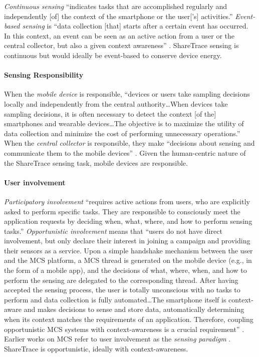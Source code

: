 \emph{Continuous sensing} ``indicates tasks that are accomplished regularly and independently [of] the context of the smartphone or the user['s] activities.'' \emph{Event-based sensing} is ``data collection [that] starts after a certain event has occurred. In this context, an event can be seen as an active action from a user or the central collector, but also a given context awareness'' \citep{Capponi2019}. ShareTrace sensing is continuous but would ideally be event-based to conserve device energy.

\paragraph{Sensing Responsibility}

When the \emph{mobile device} is responsible, ``devices or users take sampling decisions locally and independently from the central authority{\ldots}When devices take sampling decisions, it is often necessary to detect the context [of the] smartphones and wearable devices{\ldots}The objective is to maximize the utility of data collection and minimize the cost of performing unnecessary operations.'' When the \emph{central collector} is responsible, they make ``decisions about sensing and communicate them to the mobile devices'' \citep{Capponi2019}. Given the human-centric nature of the ShareTrace sensing task, mobile devices are responsible.

\paragraph{User involvement}

\emph{Participatory involvement} ``requires active actions from users, who are explicitly asked to perform specific tasks. They are responsible to consciously meet the application requests by deciding when, what, where, and how to perform sensing tasks.'' \emph{Opportunistic involvement} means that ``users do not have direct involvement, but only declare their interest in joining a campaign and providing their sensors as a service. Upon a simple handshake mechanism between the user and the MCS platform, a MCS thread is generated on the mobile device (e.g., in the form of a mobile app), and the decisions of what, where, when, and how to perform the sensing are delegated to the corresponding thread. After having accepted the sensing process, the user is totally unconscious with no tasks to perform and data collection is fully automated{\ldots}The smartphone itself is context-aware and makes decisions to sense and store data, automatically determining when its context matches the requirements of an application. Therefore, coupling opportunistic MCS systems with context-awareness is a crucial requirement'' \citep{Capponi2019}. Earlier works on MCS refer to user involvement as the \emph{sensing paradigm} \citep{Lane2010, Ganti2011, Ma2014}. ShareTrace is opportunistic, ideally with context-awareness.

